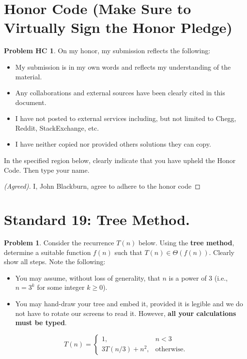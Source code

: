 \documentclass[11pt]{article}
\theoremstyle{definition}
\theoremstyle{definition}
\newtheorem{required}{Problem}
\newtheorem*{requiredHC}{Problem HC}
\theoremstyle{definition}
\begin{document}
\section*{Honor Code (Make Sure to Virtually Sign the Honor Pledge)} 
\hypertarget{HonorCode}{}

\begin{requiredHC}
On my honor, my submission reflects the following:
\begin{itemize}
\item My submission is in my own words and reflects my understanding of the material.
\item Any collaborations and external sources have been clearly cited in this document.
\item I have not posted to external services including, but not limited to Chegg, Reddit, StackExchange, etc.
\item I have neither copied nor provided others solutions they can copy.
\end{itemize}

\noindent In the specified region below, clearly indicate that you have upheld the Honor Code. Then type your name. 
\end{requiredHC}

\begin{proof}[(Agreed)]

I, John Blackburn, agree to adhere to the honor code
\end{proof}



\newpage
\section{Standard 19: Tree Method.}

\begin{required}
Consider the recurrence $T(n)$ below. Using the {\bf tree method}, determine a suitable function $f(n)$ such that $T(n) \in \Theta(f(n))$. Clearly show all steps. Note the following:
\begin{itemize}
\item You may assume, without loss of generality, that $n$ is a power of $3$ (i.e., $n = 3^{k}$ for some integer $k \geq 0$).
\item You may hand-draw your tree and embed it, provided it is legible and we do not have to rotate our screens to read it. However, \textbf{all your calculations must be typed}.
\end{itemize}

\[
T(n) = \begin{cases} 1, &  n < 3 \\ 
3T(n/3) + n^{2}, &  \text{otherwise.} \end{cases}
\]

\end{required}
\end{document}
